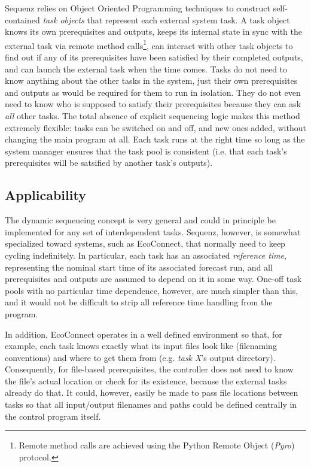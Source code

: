 \documentclass[11pt,a4paper]{article}
\begin{document}
Sequenz relies on Object Oriented Programming techniques to construct
self-contained {\em task objects} that represent each external system
task.  A task object knows its own prerequisites and outputs, keeps its
internal state in sync with the external task via remote method
calls\footnote{Remote method calls are achieved using the Python Remote
Object ({\em Pyro}) protocol.}, can interact with other task objects to
find out if any of its prerequisites have been satisfied by their
completed outputs, and can launch the external task when the time comes.
Tasks do not need to know anything about the other tasks in the system,
just their own prerequisites and outputs as would be required for them
to run in isolation. They do not even need to know who is supposed to
satisfy their prerequisites because they can ask {\em all} other tasks.
The total absence of explicit sequencing logic makes this method
extremely flexible: tasks can be switched on and off, and new ones
added, without changing the main program at all. Each task runs at the
right time so long as the system manager ensures that the task pool is
consistent (i.e. that each task's prerequisites will be satsified by
another task's outputs).


\subsection{Applicability}

The dynamic sequencing concept is very general and could in principle be
implemented for any set of interdependent tasks. Sequenz, however, is
somewhat specialized toward systems, such as EcoConnect, that normally
need to keep cycling indefinitely. In particular, each task has an
associated {\em reference time}, representing the nominal start time of
its associated forecast run, and all prerequisites and outputs are
assumed to depend on it in some way.  One-off task pools with no
particular time dependence, however, are much simpler than this, and it
would not be difficult to strip all reference time handling from the
program.

In addition, EcoConnect operates in a well defined environment so that,
for example, each task knows exactly what its input files look like
(filenaming conventions) and where to get them from (e.g. {\em task X}'s
output directory). Consequently, for file-based prerequisites, the
controller does not need to know the file's actual location or check for
its existence, because the external tasks already do that. It could,
however, easily be made to pass file locations between tasks so that all
input/output filenames and paths could be defined centrally in the
control program itself.  
\end{document}
